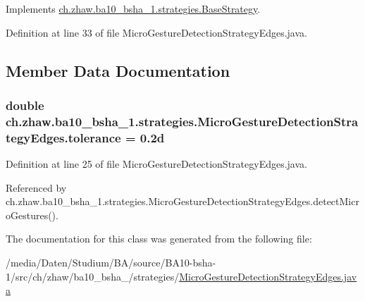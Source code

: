 Implements \hyperlink{classch_1_1zhaw_1_1ba10__bsha__1_1_1strategies_1_1BaseStrategy_a0496e8fd0099a5f0f7765322d7e752a9}{ch.zhaw.ba10\_\-bsha\_\-1.strategies.BaseStrategy}.

Definition at line 33 of file MicroGestureDetectionStrategyEdges.java.

\subsection{Member Data Documentation}
\hypertarget{classch_1_1zhaw_1_1ba10__bsha__1_1_1strategies_1_1MicroGestureDetectionStrategyEdges_a17536b25d63e07e0c5c776e017a4b29c}{
\subsubsection[{tolerance}]{\setlength{\rightskip}{0pt plus 5cm}double {\bf ch.zhaw.ba10\_\-bsha\_\-1.strategies.MicroGestureDetectionStrategyEdges.tolerance} = 0.2d}}
\label{classch_1_1zhaw_1_1ba10__bsha__1_1_1strategies_1_1MicroGestureDetectionStrategyEdges_a17536b25d63e07e0c5c776e017a4b29c}


Definition at line 25 of file MicroGestureDetectionStrategyEdges.java.

Referenced by ch.zhaw.ba10\_\-bsha\_\-1.strategies.MicroGestureDetectionStrategyEdges.detectMicroGestures().

The documentation for this class was generated from the following file:\begin{DoxyCompactItemize}
\item 
/media/Daten/Studium/BA/source/BA10-\/bsha-\/1/src/ch/zhaw/ba10\_\-bsha\_/strategies/\hyperlink{MicroGestureDetectionStrategyEdges_8java}{MicroGestureDetectionStrategyEdges.java}\end{DoxyCompactItemize}
